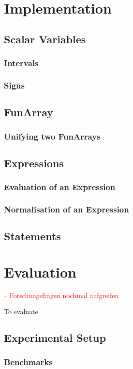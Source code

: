 \documentclass{report}
\begin{document}
\chapter{Implementation}

\section{Scalar Variables}
\subsection{Intervals}
\subsection{Signs}
\section{FunArray}
\subsection{Unifying two FunArrays}
\section{Expressions}
\subsection{Evaluation of an Expression}
\subsection{Normalisation of an Expression}
\section{Statements}



\chapter{Evaluation}
\textcolor{red}{-- Forschungsfragen nochmal aufgreifen}

To evaluate 

\section{Experimental Setup}
\subsection{Benchmarks}
\end{document}
